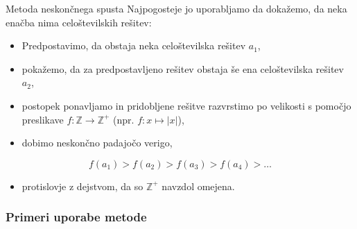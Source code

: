 \documentclass{beamer}
\newcommand{\abs}[1]{\ensuremath{\lvert #1 \rvert}}
\newcommand{\mth}[1]{\ensuremath{\mathbb{#1}}}
\newcommand{\Z}{\mth{Z}}
\newcommand{\Zp}{\mth{Z}^{+}}
\newcommand{\map}[3]{\ensuremath{{#1}: {#2} \rightarrow {#3}}}
\begin{document}
\begin{frame}

\begin{block}{Metoda neskončnega spusta}
	Najpogosteje jo uporabljamo da dokažemo, da neka enačba nima celoštevilskih rešitev:
	
	\begin{itemize}
		\item Predpostavimo, da obstaja neka celoštevilska rešitev $a_1$,
		\pause
		\item pokažemo, da za predpostavljeno rešitev obstaja še ena celoštevilska rešitev $a_2$,
		\pause
		\item postopek ponavljamo in pridobljene rešitve razvrstimo po velikosti s pomočjo preslikave $\map{f}{\Z}{\Zp}$ (npr. $f: x \mapsto\abs{x}$),
		\pause
		\item dobimo neskončno padajočo verigo,
		\pause
	\end{itemize}
	\[
	f(a_1) > f(a_2) > f(a_3) > f(a_4) > \ldots
	\]
	\begin{itemize}
		\pause
		\item protislovje z dejstvom, da so $\Zp$ navzdol omejena.
	\end{itemize}
	
\end{block}

\end{frame}


\begin{frame}
  \frametitle{Primeri uporabe metode}



\end{frame}
\end{document}
